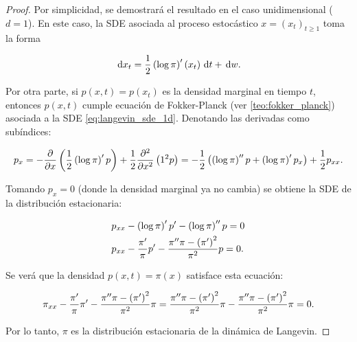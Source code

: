 \begin{proof}
    Por simplicidad, se demostrará el resultado en el caso unidimensional ($d=1$). En este caso, la SDE asociada al proceso estocástico $x=(x_t)_{t\geq 1}$ toma la forma

    \begin{equation}
        \label{eq:langevin_sde_1d}
        \,\operatorname{d}\! x_t = \frac{1}{2}\left(\log \pi\right)'(x_t) \,\operatorname{d}\! t + \,\operatorname{d}\! w .
    \end{equation}

    Por otra parte, si $p(x,t)=p(x_t)$ es la densidad marginal en tiempo $t$, entonces $p(x,t)$ cumple ecuación de Fokker-Planck (ver \autoref{teo:fokker_planck}) asociada a la SDE \eqref{eq:langevin_sde_1d}. Denotando las derivadas como subíndices:

    \begin{align*}
        p_x
        = -\frac{\partial}{\partial x} \left(\frac{1}{2}\left(\log \pi\right)' p\right) + \frac{1}{2} \frac{\partial^2}{\partial x^2} \left(1^2 p\right)
        = -\frac{1}{2}\left(\left(\log\pi\right)''p+\left(\log\pi\right)'p_x\right) + \frac{1}{2}p_{xx}.
    \end{align*}

    Tomando $p_x=0$ (donde la densidad marginal ya no cambia) se obtiene la SDE de la distribución estacionaria:

    \begin{align*}
         & p_{xx} - \left(\log\pi\right)'p' - \left(\log\pi\right)'' p = 0                  \\
         & p_{xx}-\frac{\pi'}{\pi}p' - \frac{\pi''\pi-\left(\pi'\right)^2}{\pi^2}p = 0.
    \end{align*}

    Se verá que la densidad $p(x,t)=\pi(x)$ satisface esta ecuación:

    \begin{equation*}
        \pi_{xx}-\frac{\pi'}{\pi}\pi' - \frac{\pi''\pi-\left(\pi'\right)^2}{\pi^2}\pi
        = \frac{\pi''\pi-\left(\pi'\right)^2}{\pi^2}\pi - \frac{\pi''\pi-\left(\pi'\right)^2}{\pi^2}\pi = 0 .
    \end{equation*}

    Por lo tanto, $\pi$ es la distribución estacionaria de la dinámica de Langevin.
\end{proof}

